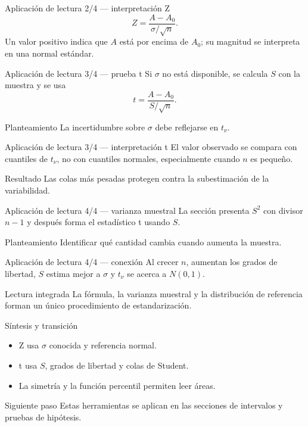 \documentclass[10pt,aspectratio=169]{beamer}
\begin{document}
\begin{frame}{Aplicación de lectura 2/4 --- interpretación Z}
  \footnotesize
  \[
    Z=\frac{A-A_0}{\sigma/\sqrt n}.
  \]
  Un valor positivo indica que $A$ está por encima de $A_0$; su magnitud se
  interpreta en una normal estándar.
\end{frame}

\begin{frame}{Aplicación de lectura 3/4 --- prueba t}
  \footnotesize
  Si $\sigma$ no está disponible, se calcula $S$ con la muestra y se usa
  \[
    t=\frac{A-A_0}{S/\sqrt n}.
  \]
  \begin{block}{Planteamiento}
    La incertidumbre sobre $\sigma$ debe reflejarse en $t_\nu$.
  \end{block}
\end{frame}

\begin{frame}{Aplicación de lectura 3/4 --- interpretación t}
  \footnotesize
  El valor observado se compara con cuantiles de $t_\nu$, no con cuantiles
  normales, especialmente cuando $n$ es pequeño.
  \begin{alertblock}{Resultado}
    Las colas más pesadas protegen contra la subestimación de la variabilidad.
  \end{alertblock}
\end{frame}

\begin{frame}{Aplicación de lectura 4/4 --- varianza muestral}
  \footnotesize
  La sección presenta $S^2$ con divisor $n-1$ y después forma el estadístico
  t usando $S$.
  \begin{block}{Planteamiento}
    Identificar qué cantidad cambia cuando aumenta la muestra.
  \end{block}
\end{frame}

\begin{frame}{Aplicación de lectura 4/4 --- conexión}
  \footnotesize
  Al crecer $n$, aumentan los grados de libertad, $S$ estima mejor a $\sigma$ y
  $t_\nu$ se acerca a $N(0,1)$.
  \begin{exampleblock}{Lectura integrada}
    La fórmula, la varianza muestral y la distribución de referencia forman un
    único procedimiento de estandarización.
  \end{exampleblock}
\end{frame}

\begin{frame}{Síntesis y transición}
  \footnotesize
  \begin{itemize}\itemsep=0.12cm
    \item Z usa $\sigma$ conocida y referencia normal.
    \item t usa $S$, grados de libertad y colas de Student.
    \item La simetría y la función percentil permiten leer áreas.
  \end{itemize}
  \begin{alertblock}{Siguiente paso}
    Estas herramientas se aplican en las secciones de intervalos y pruebas de
    hipótesis.
  \end{alertblock}
\end{frame}
\end{document}
